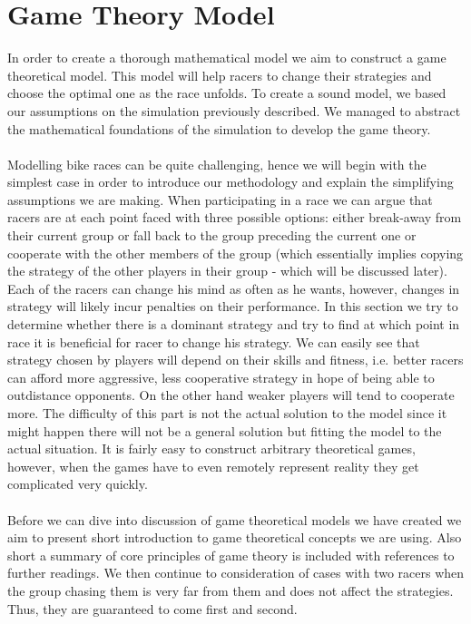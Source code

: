 \documentclass[10pt, a4paper]{report}
\begin{document}

\section{Game Theory Model}\label{sec:gameth}

In order to create a thorough mathematical model we aim to construct a game theoretical model. This model will help racers to change their strategies and choose the optimal one as the race unfolds. To create a sound model, we based our assumptions on the simulation previously described. We managed to abstract the mathematical foundations of the simulation to develop the game theory.\\\\
Modelling bike races can be quite challenging, hence we will begin with the simplest case in order to introduce our methodology and explain the simplifying assumptions we are making. When participating in a race we can argue that racers are at each point faced with three possible options: either break-away from their current group or fall back to the group preceding the current one or cooperate with the other members of the group (which essentially implies copying the strategy of the other players in their group - which will be discussed later). Each of the racers can change his mind as often as he wants, however, changes in strategy will likely incur penalties on their performance. In this section we try to determine whether there is a dominant strategy and try to find at which point in race it is beneficial for racer to change his strategy. We can easily see that strategy chosen by players will depend on their skills and fitness, i.e. better racers can afford more aggressive, less cooperative strategy in hope of being able to outdistance opponents. On the other hand weaker players will tend to cooperate more. The difficulty of this part is not the actual solution to the model since it might happen there will not be a general solution but fitting the model to the actual situation. It is fairly easy to construct arbitrary theoretical games, however, when the games have to even remotely represent reality they get complicated very quickly.\\\\
Before we can dive into discussion of game theoretical models we have created we aim to present short introduction to game theoretical concepts we are using. Also short a summary of core principles of game theory is included with references to further readings. We then continue to consideration of cases with two racers when the group chasing them is very far from them and does not affect the strategies. Thus, they are guaranteed to come first and second.
\end{document}
